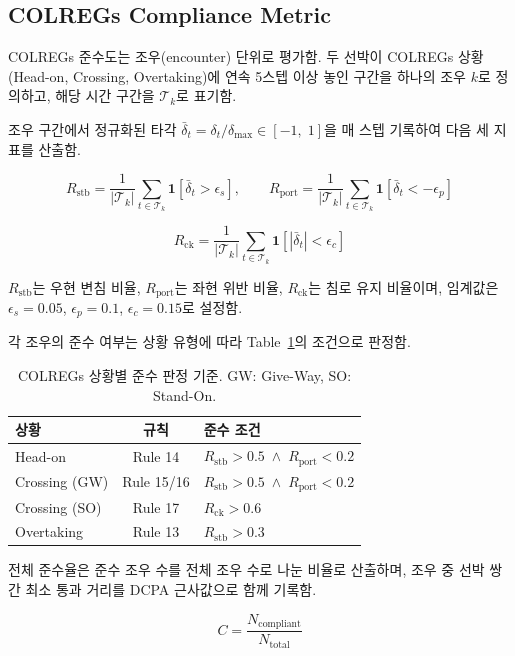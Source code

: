 \documentclass{article}
\begin{document}
\subsection*{COLREGs Compliance Metric}

COLREGs 준수도는 조우(encounter) 단위로 평가함.
두 선박이 COLREGs 상황(Head-on, Crossing, Overtaking)에 연속 5스텝 이상 놓인 구간을 하나의 조우 $k$로 정의하고, 해당 시간 구간을 $\mathcal{T}_k$로 표기함.

조우 구간에서 정규화된 타각 $\bar{\delta}_t = \delta_t / \delta_{\max} \in [-1,\;1]$을 매 스텝 기록하여 다음 세 지표를 산출함.

\begin{equation}
  R_{\text{stb}} = \frac{1}{|\mathcal{T}_k|}\sum_{t \in \mathcal{T}_k} \mathbf{1}\!\left[\bar{\delta}_t > \epsilon_s\right], \qquad
  R_{\text{port}} = \frac{1}{|\mathcal{T}_k|}\sum_{t \in \mathcal{T}_k} \mathbf{1}\!\left[\bar{\delta}_t < -\epsilon_p\right]
\end{equation}

\begin{equation}
  R_{\text{ck}} = \frac{1}{|\mathcal{T}_k|}\sum_{t \in \mathcal{T}_k} \mathbf{1}\!\left[|\bar{\delta}_t| < \epsilon_c\right]
\end{equation}

\noindent $R_{\text{stb}}$는 우현 변침 비율, $R_{\text{port}}$는 좌현 위반 비율, $R_{\text{ck}}$는 침로 유지 비율이며, 임계값은 $\epsilon_s{=}0.05$, $\epsilon_p{=}0.1$, $\epsilon_c{=}0.15$로 설정함.

각 조우의 준수 여부는 상황 유형에 따라 Table~\ref{tab:colregs_criteria}의 조건으로 판정함.

\begin{table}[h]
\centering
\caption{COLREGs 상황별 준수 판정 기준. GW: Give-Way, SO: Stand-On.}
\label{tab:colregs_criteria}
\renewcommand{\arraystretch}{1.3}
\begin{tabular}{@{}lcl@{}}
\toprule
\textbf{상황} & \textbf{규칙} & \textbf{준수 조건} \\
\midrule
Head-on       & Rule 14    & $R_{\text{stb}} > 0.5 \;\wedge\; R_{\text{port}} < 0.2$ \\
Crossing (GW) & Rule 15/16 & $R_{\text{stb}} > 0.5 \;\wedge\; R_{\text{port}} < 0.2$ \\
Crossing (SO) & Rule 17    & $R_{\text{ck}} > 0.6$ \\
Overtaking    & Rule 13    & $R_{\text{stb}} > 0.3$ \\
\bottomrule
\end{tabular}
\end{table}

\noindent 전체 준수율은 준수 조우 수를 전체 조우 수로 나눈 비율로 산출하며, 조우 중 선박 쌍 간 최소 통과 거리를 DCPA 근사값으로 함께 기록함.

\begin{equation}
  C = \frac{N_{\text{compliant}}}{N_{\text{total}}}
\end{equation}
\end{document}
